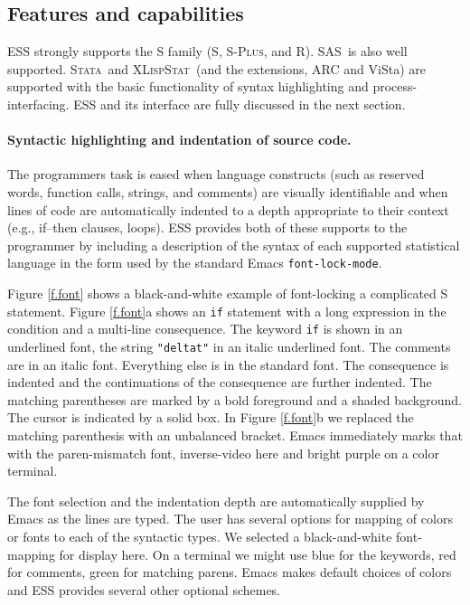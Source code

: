 \documentclass{article}
\newcommand*{\SAS}{\textsc{SAS}}
\newcommand*{\Splus}{\textsc{S-Plus}}
\newcommand*{\XLispStat}{\textsc{XLispStat}}
\newcommand*{\Stata}{\textsc{Stata}}
\newcommand{\stexttt}[1]{{\small\texttt{#1}}}
\begin{document}
\subsection{Features and capabilities}
\label{sec:ESS:features}

ESS strongly supports the S family (S, \Splus, and R).
\SAS\ is also well supported.  \Stata\
and \XLispStat\ (and the extensions, ARC and ViSta) are
supported with the basic functionality of syntax highlighting and
process-interfacing.  ESS and its interface are fully discussed in the
next section.

\paragraph{Syntactic highlighting and indentation of source code.}
The programmers task is eased when language constructs (such as
reserved words, function calls, strings, and comments) are visually
identifiable and when lines of code are automatically indented to a
depth appropriate to their context (e.g., if--then clauses, loops).
ESS provides both of these supports to the programmer by
including a description of the syntax of each
supported statistical language in the form used by the standard Emacs
\stexttt{font-lock-mode}.  

Figure \ref{f.font} shows a black-and-white example of font-locking a
complicated S statement.  Figure \ref{f.font}a shows an \stexttt{if}
statement with a long expression in the condition and a multi-line
consequence.  The keyword \stexttt{if} is shown in an underlined font,
the string \stexttt{"deltat"} in an italic underlined font.  The
comments are in an italic font.  Everything else is in the standard
font.  The consequence is indented and the continuations of the
consequence are further indented.  The matching parentheses are marked
by a bold foreground and a shaded background.  The cursor is indicated
by a solid box.  In Figure \ref{f.font}b we replaced the matching
parenthesis with an unbalanced bracket.  Emacs immediately marks that
with the paren-mismatch font, inverse-video here and bright purple on
a color terminal.

The font selection and the indentation depth are automatically
supplied by Emacs as the lines are typed.  The user has several
options for mapping of colors or fonts to each of the syntactic types.
We selected a black-and-white font-mapping for display here.  On a
terminal we might use blue for the keywords, red for comments, green
for matching parens.  Emacs makes default choices of colors and ESS
provides several other optional schemes.
\end{document}
